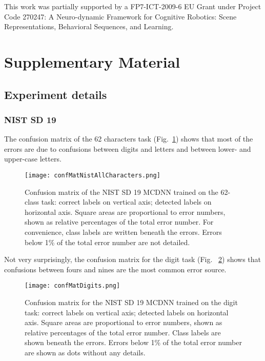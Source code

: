 \documentclass[a4paper]{article}
\begin{document}
This work was partially supported by a FP7-ICT-2009-6 EU Grant under Project Code 270247: A Neuro-dynamic Framework for Cognitive Robotics: Scene Representations, Behavioral Sequences, and Learning.




\newpage
\section{Supplementary Material}

\subsection{Experiment details}

\subsubsection{NIST SD 19}

The confusion matrix of the 62 characters task (Fig.~\ref{Fig:confMatNISTAllCharacters}) shows that most of the errors are due to confusions between digits and letters and between lower- and upper-case letters.

\begin{figure}[ht!]
\hfill
\begin{center}
\texttt{[image: confMatNistAllCharacters.png]}
\end{center}
\caption{Confusion matrix of the NIST SD 19 MCDNN trained on the 62-class task: correct labels on vertical axis; detected labels on horizontal axis. Square areas are proportional to error numbers, shown as relative percentages of the total error number. For convenience, class labels are written beneath the errors. Errors below 1\% of the total error number are not detailed.}
\label{Fig:confMatNISTAllCharacters}
\end{figure}

Not very surprisingly, the confusion matrix for the digit task (Fig. ~\ref{Fig:confMatNISTDigits}) shows that confusions between fours and nines are the most common error source.

\begin{figure}[ht!]
\hfill
\begin{center}
\texttt{[image: confMatDigits.png]}
\end{center}
\caption{Confusion matrix for the NIST SD 19 MCDNN trained on the digit task: correct labels on vertical axis; detected labels on horizontal axis. Square areas are proportional to error numbers, shown as relative percentages of the total error number. Class labels are shown beneath the errors. Errors below 1\% of the total error number are shown as dots without any details.}
\label{Fig:confMatNISTDigits}
\end{figure}
\end{document}
